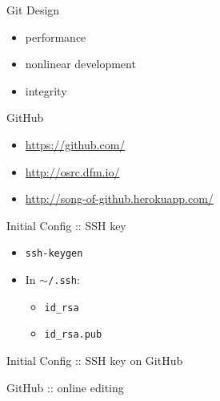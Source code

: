 \documentclass{beamer}
\begin{document}
\begin{frame}{Git Design}
  \begin{itemize}
    \item performance
    \item nonlinear development
    \item integrity
  \end{itemize}
\end{frame}

\begin{frame}{GitHub}
  \begin{itemize}
    \item \href{http://https://github.com/}{https://github.com/}
    \item \href{http://osrc.dfm.io/}{http://osrc.dfm.io/}
    \item \href{http://song-of-github.herokuapp.com/}{http://song-of-github.herokuapp.com/}
  \end{itemize}
\end{frame}

\begin{frame}{Initial Config :: SSH key}
  \begin{itemize}
    \item \texttt{ssh-keygen}
    \item In \texttt{$\sim$/.ssh}:
      \begin{itemize}
        \item \texttt{id\_rsa}
        \item \texttt{id\_rsa.pub}
      \end{itemize}
  \end{itemize}
\end{frame}

\begin{frame}{Initial Config :: SSH key on GitHub}
  \begin{center}
  \end{center}
\end{frame}

\begin{frame}{GitHub :: online editing}
  \begin{center}
  \end{center}
\end{frame}
\end{document}
